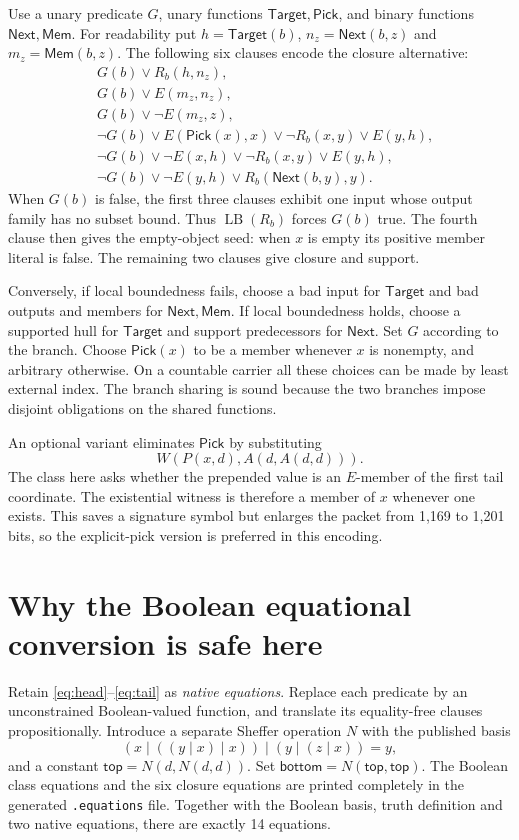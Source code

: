 \documentclass[11pt]{article}
\newcommand{\LB}{\operatorname{LB}}
\newcommand{\NAND}{\mathbin{\vert}}
\begin{document}
Use a unary predicate $G$, unary functions $\mathsf{Target},\mathsf{Pick}$, and binary functions $\mathsf{Next},\mathsf{Mem}$. For readability put
$h=\mathsf{Target}(b)$, $n_z=\mathsf{Next}(b,z)$ and
$m_z=\mathsf{Mem}(b,z)$. The following six clauses encode the closure alternative:
\begin{align*}
&G(b)\lor R_b(h,n_z),\\
&G(b)\lor E(m_z,n_z),\\
&G(b)\lor\neg E(m_z,z),\\
&\neg G(b)\lor E(\mathsf{Pick}(x),x)\lor\neg R_b(x,y)\lor E(y,h),\\
&\neg G(b)\lor\neg E(x,h)\lor\neg R_b(x,y)\lor E(y,h),\\
&\neg G(b)\lor\neg E(y,h)\lor R_b(\mathsf{Next}(b,y),y).
\end{align*}
When $G(b)$ is false, the first three clauses exhibit one input whose output family has no subset bound. Thus $\LB(R_b)$ forces $G(b)$ true. The fourth clause then gives the empty-object seed: when $x$ is empty its positive member literal is false. The remaining two clauses give closure and support.

Conversely, if local boundedness fails, choose a bad input for $\mathsf{Target}$ and bad outputs and members for $\mathsf{Next},\mathsf{Mem}$. If local boundedness holds, choose a supported hull for $\mathsf{Target}$ and support predecessors for $\mathsf{Next}$. Set $G$ according to the branch. Choose $\mathsf{Pick}(x)$ to be a member whenever $x$ is nonempty, and arbitrary otherwise. On a countable carrier all these choices can be made by least external index. The branch sharing is sound because the two branches impose disjoint obligations on the shared functions.

An optional variant eliminates $\mathsf{Pick}$ by substituting
\[
 W(P(x,d),A(d,A(d,d))).
\]
The class here asks whether the prepended value is an $E$-member of the first tail coordinate. The existential witness is therefore a member of $x$ whenever one exists. This saves a signature symbol but enlarges the packet from 1,169 to 1,201 bits, so the explicit-pick version is preferred in this encoding.

\section{Why the Boolean equational conversion is safe here}

Retain \eqref{eq:head}--\eqref{eq:tail} as \emph{native equations}. Replace each predicate by an unconstrained Boolean-valued function, and translate its equality-free clauses propositionally. Introduce a separate Sheffer operation $N$ with the published basis
\[
 (x\NAND((y\NAND x)\NAND x))\NAND(y\NAND(z\NAND x))=y,
\]
and a constant $\mathsf{top}=N(d,N(d,d))$. Set
$\mathsf{bottom}=N(\mathsf{top},\mathsf{top})$.
The Boolean class equations and the six closure equations are printed completely in the generated \texttt{.equations} file. Together with the Boolean basis, truth definition and two native equations, there are exactly 14 equations.
\end{document}
